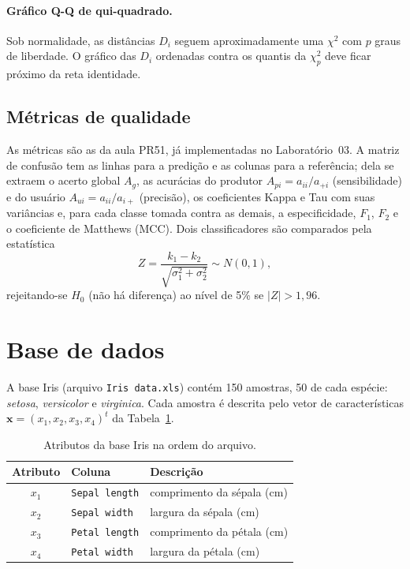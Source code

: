 \documentclass[12pt,a4paper]{article}
\newcommand{\setosa}{\emph{setosa}}
\newcommand{\versicolor}{\emph{versicolor}}
\newcommand{\virginica}{\emph{virginica}}
\begin{document}
\paragraph{Gráfico Q-Q de qui-quadrado.} Sob normalidade, as distâncias $D_i$ seguem aproximadamente uma $\chi^2$ com $p$ graus de liberdade. O gráfico das $D_i$ ordenadas contra os quantis da $\chi^2_p$ deve ficar próximo da reta identidade.

\subsection{Métricas de qualidade}

As métricas são as da aula PR51, já implementadas no Laboratório~03. A matriz de confusão tem as linhas para a predição e as colunas para a referência; dela se extraem o acerto global $A_g$, as acurácias do produtor $A_{pi} = a_{ii}/a_{+i}$ (sensibilidade) e do usuário $A_{ui} = a_{ii}/a_{i+}$ (precisão), os coeficientes Kappa e Tau com suas variâncias e, para cada classe tomada contra as demais, a especificidade, $F_1$, $F_2$ e o coeficiente de Matthews (MCC). Dois classificadores são comparados pela estatística
\begin{equation}
  Z = \frac{k_1 - k_2}{\sqrt{\sigma_1^2 + \sigma_2^2}} \sim N(0, 1),
  \label{eq:z}
\end{equation}
rejeitando-se $H_0$ (não há diferença) ao nível de 5\% se $|Z| > 1{,}96$.

\section{Base de dados}

A base Iris (arquivo \texttt{Iris data.xls}) contém 150 amostras, 50 de cada espécie: \setosa{}, \versicolor{} e \virginica{}. Cada amostra é descrita pelo vetor de características $\mathbf{x} = (x_1, x_2, x_3, x_4)^t$ da Tabela~\ref{tab:atributos}.

\begin{table}[H]
\centering
\caption{Atributos da base Iris na ordem do arquivo.}
\label{tab:atributos}
\begin{tabular}{cll}
\toprule
Atributo & Coluna & Descrição \\
\midrule
$x_1$ & \texttt{Sepal length} & comprimento da sépala (cm) \\
$x_2$ & \texttt{Sepal width}  & largura da sépala (cm) \\
$x_3$ & \texttt{Petal length} & comprimento da pétala (cm) \\
$x_4$ & \texttt{Petal width}  & largura da pétala (cm) \\
\bottomrule
\end{tabular}
\end{table}
\end{document}
